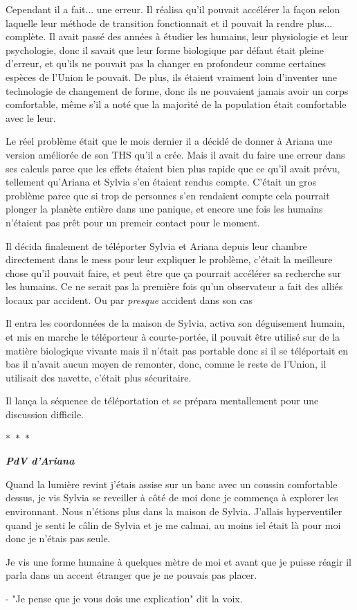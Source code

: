 \documentclass[12pt,hidelinks,a4paper]{book}
\newcommand{\sep}{\begin{center}
    $\ast$~$\ast$~$\ast$
  \end{center}}
\begin{document}
Cependant il a fait... une erreur. Il réalisa qu'il pouvait accélérer la façon selon laquelle leur méthode de transition 
fonctionnait et il pouvait la rendre plus... complète. Il avait passé des années à étudier les humains, leur physiologie 
et leur psychologie, donc il savait que leur forme biologique par défaut était pleine d'erreur, et qu'ils ne pouvait pas 
la changer en profondeur comme certaines espèces de l'Union le pouvait. De plus, ils étaient vraiment loin d'inventer 
une technologie de changement de forme, donc ils ne pouvaient jamais avoir un corps comfortable, même s'il a noté 
que la majorité de la population était comfortable avec le leur.\par 
\bigskip

Le réel problème était que le mois dernier il a décidé de donner à Ariana une version améliorée de son THS qu'il a crée.
Mais il avait du faire une erreur dans ses calculs parce que les effets étaient bien plus rapide que ce qu'il avait prévu,
tellement qu'Ariana et Sylvia s'en étaient rendus compte. C'était un gros problème parce que si trop de personnes s'en rendaient 
compte cela pourrait plonger la planète entière dans une panique, et encore une fois les humains n'étaient pas prêt pour 
un premeir contact pour le moment. \par 
\bigskip

Il décida finalement de téléporter Sylvia et Ariana depuis leur chambre directement dans le mess pour leur expliquer 
le problème, c'était la meilleure chose qu'il pouvait faire, et peut être que ça pourrait accélérer sa recherche 
sur les humains. Ce ne serait pas la première fois qu'un observateur a fait des alliés locaux par accident. Ou 
par \textit{presque} accident dans son cas\par 
\bigskip

Il entra les coordonnées de la maison de Sylvia, activa son déguisement humain, et mis en marche le téléporteur à courte-portée,
il pouvait être utilisé sur de la matière biologique vivante mais il n'était pas portable donc si il se téléportait en bas il 
n'avait aucun moyen de remonter, donc, comme le reste de l'Union, il utilisait des navette, c'était plus sécuritaire.\par 
\bigskip

Il lança la séquence de téléportation et se prépara mentallement pour une discussion difficile.

\sep

\textit{\textbf{PdV d'Ariana}}

Quand la lumière revint j'étais assise sur un banc avec un coussin comfortable dessus, je vis Sylvia se reveiller 
à côté de moi donc je commença à explorer les environnant. Nous n'étions plus dans la maison de Sylvia.
J'allais hyperventiler quand je senti le câlin de Sylvia et je me calmai, au moins iel était là pour moi donc je n'étais 
pas seule.\par 
\bigskip

Je vis une forme humaine à quelques mètre de moi et avant que je puisse réagir il parla dans un accent étranger que je ne pouvais
pas placer.\par 
\bigskip

- "Je pense que je vous dois une explication" dit la voix.


\printglossaries 
\end{document}
